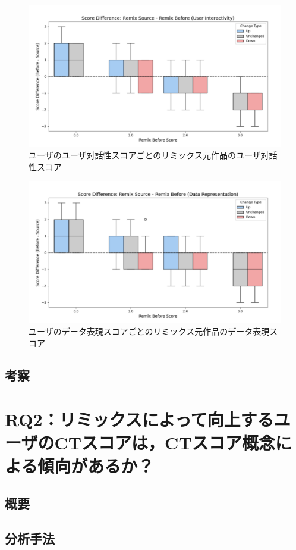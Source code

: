 \documentclass[11pt]{jreport}
\begin{document}
\begin{figure}[h]
\centerline{\includegraphics[width=0.7\linewidth]{@BSthesis2024_Horio/BSthesis2024_Horio_fig/UserInteractivity-boxplot.pdf}}
\caption{ユーザのユーザ対話性スコアごとのリミックス元作品のユーザ対話性スコア}
\label{fig:UserInteractivity-boxplot}
\end{figure}
\begin{figure}[h]
\centerline{\includegraphics[width=0.7\linewidth]{@BSthesis2024_Horio/BSthesis2024_Horio_fig/DataRepresentation-boxplot.pdf}}
\caption{ユーザのデータ表現スコアごとのリミックス元作品のデータ表現スコア}
\label{fig:DataRepresentation-boxplot}
\end{figure}
\section{考察}

\chapter{RQ2：リミックスによって向上するユーザのCTスコアは，CTスコア概念による傾向があるか？}
\section{概要}

\section{分析手法}
\end{document}
